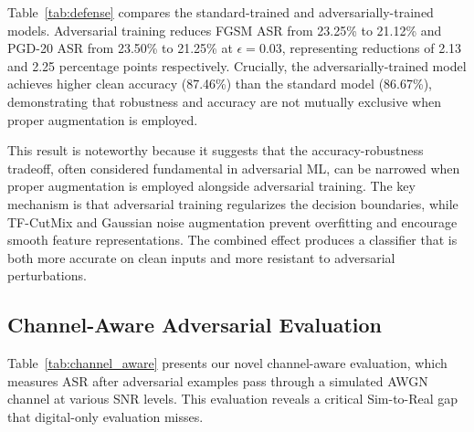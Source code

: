 \documentclass[conference]{IEEEtran}
\begin{document}
Table~\ref{tab:defense} compares the standard-trained and adversarially-trained models. Adversarial training reduces FGSM ASR from 23.25\% to 21.12\% and PGD-20 ASR from 23.50\% to 21.25\% at $\epsilon = 0.03$, representing reductions of 2.13 and 2.25 percentage points respectively. Crucially, the adversarially-trained model achieves higher clean accuracy (87.46\%) than the standard model (86.67\%), demonstrating that robustness and accuracy are not mutually exclusive when proper augmentation is employed.

\begin{table}[t]
\centering
\caption{Defense Effectiveness at $\epsilon=0.03$ (3-Seed Mean)}\label{tab:defense}
\end{table}

This result is noteworthy because it suggests that the accuracy-robustness tradeoff, often considered fundamental in adversarial ML, can be narrowed when proper augmentation is employed alongside adversarial training. The key mechanism is that adversarial training regularizes the decision boundaries, while TF-CutMix and Gaussian noise augmentation prevent overfitting and encourage smooth feature representations. The combined effect produces a classifier that is both more accurate on clean inputs and more resistant to adversarial perturbations.

\subsection{Channel-Aware Adversarial Evaluation}

Table~\ref{tab:channel_aware} presents our novel channel-aware evaluation, which measures ASR after adversarial examples pass through a simulated AWGN channel at various SNR levels. This evaluation reveals a critical Sim-to-Real gap that digital-only evaluation misses.
\end{document}
